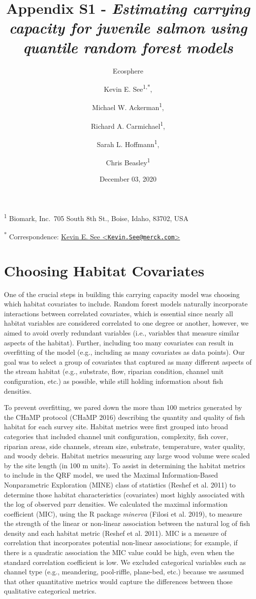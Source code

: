 \documentclass[
  12pt,
]{article}
\title{Appendix S1 - \emph{Estimating carrying capacity for juvenile salmon using quantile random forest models}}
\subtitle{Ecosphere}
\author{Kevin E. See\textsuperscript{1,*}, 
    \and Michael W. Ackerman\textsuperscript{1}, 
    \and Richard A. Carmichael\textsuperscript{1},
    \and Sarah L. Hoffmann\textsuperscript{1}, 
    \and Chris Beasley\textsuperscript{1}}
\date{December 03, 2020}
\begin{document}
\maketitle

\textsuperscript{1} Biomark, Inc.~705 South 8th St., Boise, Idaho, 83702, USA

\textsuperscript{*} Correspondence: \href{mailto:Kevin.See@merck.com}{Kevin E. See \textless{}\href{mailto:Kevin.See@merck.com}{\nolinkurl{Kevin.See@merck.com}}\textgreater{}}

\hypertarget{choosing-habitat-covariates}{%
\section{Choosing Habitat Covariates}\label{choosing-habitat-covariates}}

One of the crucial steps in building this carrying capacity model was choosing which habitat covariates to include. Random forest models naturally incorporate interactions between correlated covariates, which is essential since nearly all habitat variables are considered correlated to one degree or another, however, we aimed to avoid overly redundant variables (i.e., variables that measure similar aspects of the habitat). Further, including too many covariates can result in overfitting of the model (e.g., including as many covariates as data points). Our goal was to select a group of covariates that captured as many different aspects of the stream habitat (e.g., substrate, flow, riparian condition, channel unit configuration, etc.) as possible, while still holding information about fish densities.

To prevent overfitting, we pared down the more than 100 metrics generated by the CHaMP protocol (CHaMP 2016) describing the quantity and quality of fish habitat for each survey site. Habitat metrics were first grouped into broad categories that included channel unit configuration, complexity, fish cover, riparian areas, side channels, stream size, substrate, temperature, water quality, and woody debris. Habitat metrics measuring any large wood volume were scaled by the site length (in 100 m units). To assist in determining the habitat metrics to include in the QRF model, we used the Maximal Information-Based Nonparametric Exploration (MINE) class of statistics (Reshef et al. 2011) to determine those habitat characteristics (covariates) most highly associated with the log of observed parr densities. We calculated the maximal information coefficient (MIC), using the R package \emph{minerva} (Filosi et al. 2019), to measure the strength of the linear or non-linear association between the natural log of fish density and each habitat metric (Reshef et al. 2011). MIC is a measure of correlation that incorporates potential non-linear associations; for example, if there is a quadratic association the MIC value could be high, even when the standard correlation coefficient is low. We excluded categorical variables such as channel type (e.g., meandering, pool-riffle, plane-bed, etc.) because we assumed that other quantitative metrics would capture the differences between those qualitative categorical metrics.
\end{document}
